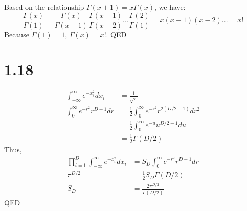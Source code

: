 \documentclass[10pt,a4paper,draft]{book}
\begin{document}
Based on the relationship $\Gamma(x+1) = x\Gamma(x)$, we have:
\begin{equation}
\frac{\Gamma(x)}{\Gamma(1)} = \frac{\Gamma(x)}{\Gamma(x-1)}\frac{\Gamma(x-1)}{\Gamma(x-2)}...\frac{\Gamma(2)}{\Gamma(1)} = x(x-1)(x-2)... = x!
\end{equation}
Because $\Gamma(1)=1$, $\Gamma(x) = x!$. QED

\section*{1.18}
\begin{equation}
\begin{aligned}
\int_{-\infty}^{\infty} e^{-x_i^2}dx_i &= \frac{1}{\sqrt{\pi}} \\
\int_0^{\infty} e^{-r^2}r^{D-1}dr &= \frac{1}{2}\int_0^{\infty} e^{-r^2} r^{2 (D/2 - 1)} dr^2 \\
&= \frac{1}{2}\int_0^{\infty} e^{-u} u^{D/2 - 1} du \\
&= \frac{1}{2}\Gamma(D/2)
\end{aligned}
\end{equation}
Thus,
\begin{equation}
\begin{aligned}
\prod_{i=1}^{D}\int_{-\infty}^{\infty} e^{-x^2_i} dx_i &= S_D\int_0^{\infty}e^{-r^2}r^{D-1}dr \\
\pi^{D/2} &= \frac{1}{2} S_D \Gamma(D/2) \\
S_D &= \frac{2\pi^{D/2}}{\Gamma(D/2)}
\end{aligned}
\end{equation}
QED
\end{document}
